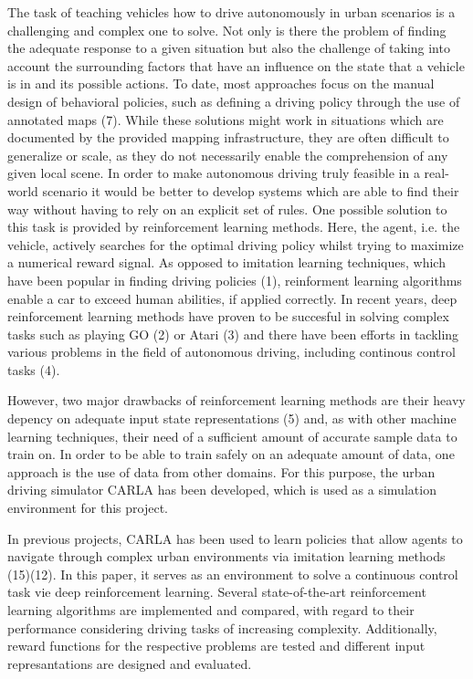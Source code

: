 \documentclass[letterpaper, 10 pt, conference]{ieeeconf}  %
\begin{document}

The task of teaching vehicles how to drive autonomously in urban scenarios is a challenging and complex one to solve. Not only is there the problem of finding the adequate response to a given situation but also the challenge of taking into account the surrounding factors that have an influence on the state that a vehicle is in and its possible actions. To date, most approaches focus on the manual design of behavioral policies, such as defining a driving policy through the use of annotated maps (7). While these solutions might work in situations which are documented by the provided mapping infrastructure, they are often difficult to generalize or scale, as they do not necessarily enable the comprehension of any given local scene. In order to make autonomous driving truly feasible in a real-world scenario it would be better to develop systems which are able to find their way without having to rely on an explicit set of rules. One possible solution to this task is provided by reinforcement learning methods. Here, the agent, i.e. the vehicle, actively searches for the optimal driving policy whilst trying to maximize a numerical reward signal. As opposed to imitation learning techniques, which have been popular in finding driving policies (1), reinforment learning algorithms enable a car to exceed human abilities, if applied correctly. In recent years, deep reinforcement learning methods have proven to be succesful in solving complex tasks such as playing GO (2) or Atari (3) and there have been efforts in tackling various problems in the field of autonomous driving, including continous control tasks (4).

However, two major drawbacks of reinforcement learning methods are their heavy depency on adequate input state representations (5) and, as with other machine learning techniques, their need of a sufficient amount of accurate sample data to train on. In order to be able to train safely on an adequate amount of data, one approach is the use of data from other domains. For this purpose, the urban driving simulator CARLA has been developed, which is used as a simulation environment for this project.

In previous projects, CARLA has been used to learn policies that allow agents to navigate through complex urban environments via imitation learning methods (15)(12). In this paper, it serves as an environment to solve a continuous control task vie deep reinforcement learning. Several state-of-the-art reinforcement learning algorithms are implemented and compared, with regard to their performance considering driving tasks of increasing complexity. Additionally, reward functions for the respective problems are tested and different input represantations are designed and evaluated.
\end{document}

